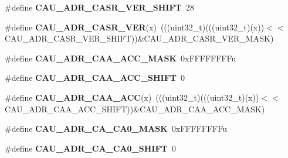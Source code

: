 \begin{DoxyCompactItemize}
\item 
\#define {\bfseries C\+A\+U\+\_\+\+A\+D\+R\+\_\+\+C\+A\+S\+R\+\_\+\+V\+E\+R\+\_\+\+S\+H\+I\+FT}~28\hypertarget{group__CAU__Register__Masks_ga22dcce65fce4ef3511615cbd4d1a0e1e}{}\label{group__CAU__Register__Masks_ga22dcce65fce4ef3511615cbd4d1a0e1e}

\item 
\#define {\bfseries C\+A\+U\+\_\+\+A\+D\+R\+\_\+\+C\+A\+S\+R\+\_\+\+V\+ER}(x)~(((uint32\+\_\+t)(((uint32\+\_\+t)(x))$<$$<$C\+A\+U\+\_\+\+A\+D\+R\+\_\+\+C\+A\+S\+R\+\_\+\+V\+E\+R\+\_\+\+S\+H\+I\+FT))\&C\+A\+U\+\_\+\+A\+D\+R\+\_\+\+C\+A\+S\+R\+\_\+\+V\+E\+R\+\_\+\+M\+A\+SK)\hypertarget{group__CAU__Register__Masks_gaa5ee00ac2f0ef91869f7f0ec921441f6}{}\label{group__CAU__Register__Masks_gaa5ee00ac2f0ef91869f7f0ec921441f6}

\item 
\#define {\bfseries C\+A\+U\+\_\+\+A\+D\+R\+\_\+\+C\+A\+A\+\_\+\+A\+C\+C\+\_\+\+M\+A\+SK}~0x\+F\+F\+F\+F\+F\+F\+F\+Fu\hypertarget{group__CAU__Register__Masks_gacc0c6924fefc7cc98506f9c0d031d9b4}{}\label{group__CAU__Register__Masks_gacc0c6924fefc7cc98506f9c0d031d9b4}

\item 
\#define {\bfseries C\+A\+U\+\_\+\+A\+D\+R\+\_\+\+C\+A\+A\+\_\+\+A\+C\+C\+\_\+\+S\+H\+I\+FT}~0\hypertarget{group__CAU__Register__Masks_gaf629b44286a47b9d05d74250f509747a}{}\label{group__CAU__Register__Masks_gaf629b44286a47b9d05d74250f509747a}

\item 
\#define {\bfseries C\+A\+U\+\_\+\+A\+D\+R\+\_\+\+C\+A\+A\+\_\+\+A\+CC}(x)~(((uint32\+\_\+t)(((uint32\+\_\+t)(x))$<$$<$C\+A\+U\+\_\+\+A\+D\+R\+\_\+\+C\+A\+A\+\_\+\+A\+C\+C\+\_\+\+S\+H\+I\+FT))\&C\+A\+U\+\_\+\+A\+D\+R\+\_\+\+C\+A\+A\+\_\+\+A\+C\+C\+\_\+\+M\+A\+SK)\hypertarget{group__CAU__Register__Masks_ga7070ca5dd02de1404c00f544caeb11c6}{}\label{group__CAU__Register__Masks_ga7070ca5dd02de1404c00f544caeb11c6}

\item 
\#define {\bfseries C\+A\+U\+\_\+\+A\+D\+R\+\_\+\+C\+A\+\_\+\+C\+A0\+\_\+\+M\+A\+SK}~0x\+F\+F\+F\+F\+F\+F\+F\+Fu\hypertarget{group__CAU__Register__Masks_ga414839bf216530416ea2338f5027fd46}{}\label{group__CAU__Register__Masks_ga414839bf216530416ea2338f5027fd46}

\item 
\#define {\bfseries C\+A\+U\+\_\+\+A\+D\+R\+\_\+\+C\+A\+\_\+\+C\+A0\+\_\+\+S\+H\+I\+FT}~0\hypertarget{group__CAU__Register__Masks_ga2e21fe07cc0b8acdef6e46075cc75770}{}\label{group__CAU__Register__Masks_ga2e21fe07cc0b8acdef6e46075cc75770}


\end{DoxyCompactItemize}
